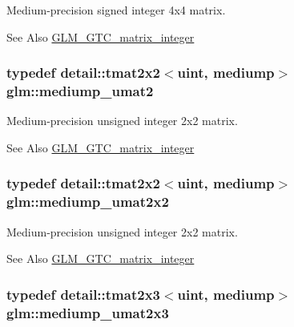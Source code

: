 Medium-\/precision signed integer 4x4 matrix. \begin{DoxySeeAlso}{See Also}
\hyperlink{group__gtc__matrix__integer}{G\-L\-M\-\_\-\-G\-T\-C\-\_\-matrix\-\_\-integer} 
\end{DoxySeeAlso}
\hypertarget{group__gtc__matrix__integer_ga388a5b9d7e494d5f5bd30b9e11ded06a}{
\subsubsection[{mediump\-\_\-umat2}]{\setlength{\rightskip}{0pt plus 5cm}typedef detail\-::tmat2x2$<$uint, mediump$>$ {\bf glm\-::mediump\-\_\-umat2}}}\label{group__gtc__matrix__integer_ga388a5b9d7e494d5f5bd30b9e11ded06a}
Medium-\/precision unsigned integer 2x2 matrix. \begin{DoxySeeAlso}{See Also}
\hyperlink{group__gtc__matrix__integer}{G\-L\-M\-\_\-\-G\-T\-C\-\_\-matrix\-\_\-integer} 
\end{DoxySeeAlso}
\hypertarget{group__gtc__matrix__integer_ga80e478f09c6caa16410198ce78fe8a2b}{
\subsubsection[{mediump\-\_\-umat2x2}]{\setlength{\rightskip}{0pt plus 5cm}typedef detail\-::tmat2x2$<$uint, mediump$>$ {\bf glm\-::mediump\-\_\-umat2x2}}}\label{group__gtc__matrix__integer_ga80e478f09c6caa16410198ce78fe8a2b}
Medium-\/precision unsigned integer 2x2 matrix. \begin{DoxySeeAlso}{See Also}
\hyperlink{group__gtc__matrix__integer}{G\-L\-M\-\_\-\-G\-T\-C\-\_\-matrix\-\_\-integer} 
\end{DoxySeeAlso}
\hypertarget{group__gtc__matrix__integer_gaaae45c5dbaad1ecd57bfa936d851be1b}{
\subsubsection[{mediump\-\_\-umat2x3}]{\setlength{\rightskip}{0pt plus 5cm}typedef detail\-::tmat2x3$<$uint, mediump$>$ {\bf glm\-::mediump\-\_\-umat2x3}}}\label{group__gtc__matrix__integer_gaaae45c5dbaad1ecd57bfa936d851be1b}
